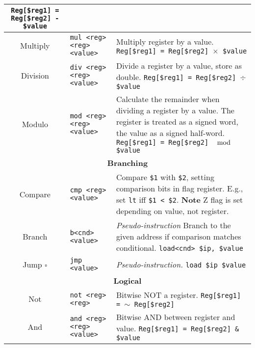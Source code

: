\documentclass[10pt]{article}
\begin{document}
\begin{longtable}{|c|l|l|}
{    \texttt{Reg[\$reg1] = Reg[\$reg2] - \$value}} \\
    \hline
    Multiply & \texttt{mul <reg> <reg> <value>} & \makecell[l]{Multiply register by a value.\\%
    \texttt{Reg[\$reg1] = Reg[\$reg2] \(\times\) \$value}} \\
    \hline
    Division & \texttt{div <reg> <reg> <value>} & \makecell[l]{Divide a register by a value, store as double.\\%
    \texttt{Reg[\$reg1] = Reg[\$reg2] \(\div\) \$value}} \\
    \hline
    Modulo & \texttt{mod <reg> <reg> <value>} & \makecell[l]{Calculate the remainder when dividing a register by a value.\\%
    The register is treated as a signed word,\\%
    the value as a signed half-word.\\%
    \texttt{Reg[\$reg1] = Reg[\$reg2] \(\mod\) \$value}} \\
    \hline \hline
    \multicolumn{3}{|c|}{\textbf{Branching}} \\
    \hline
    Compare & \texttt{cmp <reg> <value>} & \makecell[l]{Compare \texttt{\$1} with \texttt{\$2}, setting comparison bits in flag register.\\%
    E.g., set \texttt{lt} iff \texttt{\$1 < \$2}.\\%
    \textbf{Note} Z flag is set depending on value, not register.} \\
    \hline
    Branch & \texttt{b<cnd> <value>} & \makecell[l]{\textit{Pseudo-instruction}\\%
    Branch to the given address if comparison matches conditional.\\%
    \texttt{load<cnd> \$ip, \$value}} \\
    \hline
    Jump \(\square\) & \texttt{jmp <value>} & \makecell[l]{\textit{Pseudo-instruction.}\\%
    \texttt{load \$ip \$value}} \\
    \hline \hline
    \multicolumn{3}{|c|}{\textbf{Logical}} \\
    \hline
    Not & \texttt{not <reg> <reg>} & \makecell[l]{Bitwise NOT a register.\\%
    \texttt{Reg[\$reg1] = \(\sim\) Reg[\$reg2]}} \\
    \hline
    And & \texttt{and <reg> <reg> <value>} & \makecell[l]{Bitwise AND between register and value.\\%
    \texttt{Reg[\$reg1] = Reg[\$reg2] \& \$value}} \\

\end{longtable}
\end{document}

